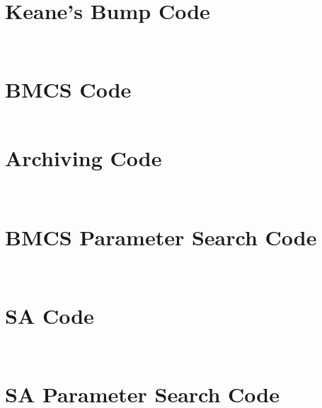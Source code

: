 \documentclass[10pt]{article}
\begin{document}
{}


\pagebreak
\appendix

\section{Keane's Bump Code}

\inputminted[linenos,fontsize=\small]{matlab}{bump.m}
\inputminted[linenos,fontsize=\small]{matlab}{bump_penalty.m}

\section{BMCS Code}

\inputminted[linenos,fontsize=\small]{matlab}{bsmc.m}

\section{Archiving Code}

\inputminted[linenos,fontsize=\small]{matlab}{archive_new.m}
\inputminted[linenos,fontsize=\small]{matlab}{archive_add.m}

\section{BMCS Parameter Search Code}

\inputminted[linenos,fontsize=\small]{matlab}{bsmc_wrapper.m}
\inputminted[linenos,fontsize=\small]{matlab}{evaluate.m}

\section{SA Code}

\inputminted[linenos,fontsize=\small]{matlab}{sa.m}
\inputminted[linenos,fontsize=\small]{c}{sa.c}

\section{SA Parameter Search Code}

\inputminted[linenos,fontsize=\small]{matlab}{cli_evaluate.m}
\end{document}
